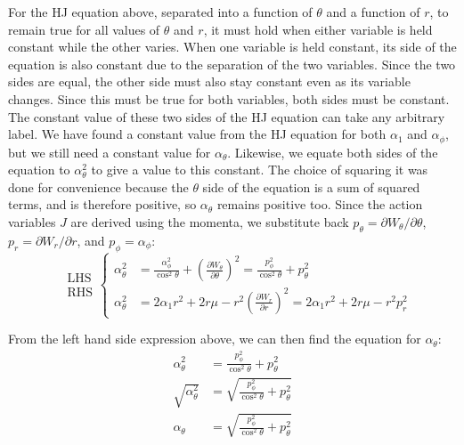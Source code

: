 \documentclass[titlepage]{article}
\begin{document}
For the HJ equation above, separated into a function of $\theta$ and a function of $r$, to remain true for all values of $\theta$ and $r$, it must hold when either variable is held constant while the other varies. When one variable is held constant, its side of the equation is also constant due to the separation of the two variables. Since the two sides are equal, the other side must also stay constant even as its variable changes. Since this must be true for both variables, both sides must be constant. \\

The constant value of these two sides of the HJ equation can take any arbitrary label. We have found a constant value from the HJ equation for both $\alpha_1$ and $\alpha_\phi$, but we still need a constant value for $\alpha_\theta$. Likewise, we equate both sides of the equation to $\alpha_\theta^2$ to give a value to this constant. The choice of squaring it was done for convenience because the $\theta$ side of the equation is a sum of squared terms, and is therefore positive, so $\alpha_\theta$ remains positive too. Since the action variables $J$ are derived using the momenta, we substitute back $p_\theta=\partial W_\theta/\partial\theta$, $p_r=\partial W_r/\partial r$, and $p_\phi=\alpha_\phi$:
\begin{equation}
	\begin{aligned}
		&\text{LHS}\\[6pt]
		&\text{RHS}
	\end{aligned}
	\left\{
	\begin{aligned}
		\alpha_\theta^2&=\frac{\alpha_\phi^2}{\cos^2\theta}+\left(\frac{\partial W_\theta}{\partial\theta}\right)^2=\frac{p_\phi^2}{\cos^2\theta}+p_\theta^2\\
		\alpha_\theta^2&=2\alpha_1r^2+2r\mu-r^2\left(\frac{\partial W_r}{\partial r}\right)^2=2\alpha_1r^2+2r\mu-r^2p_r^2
	\end{aligned}
	\right.
	\label{eq:rhslhs}
\end{equation}

From the left hand side expression above, we can then find the equation for $\alpha_\theta$:
\begin{equation}
	\begin{split}
		\alpha_\theta^2&=\frac{p_\phi^2}{\cos^2\theta}+p_\theta^2 \\
		\sqrt{\alpha_\theta^2}&=\sqrt{\frac{p_\phi^2}{\cos^2\theta}+p_\theta^2} \\
		\alpha_\theta&=\sqrt{\frac{p_\phi^2}{\cos^2\theta}+p_\theta^2}
	\end{split}
	\label{eq:alphatheta}
\end{equation}
\end{document}
